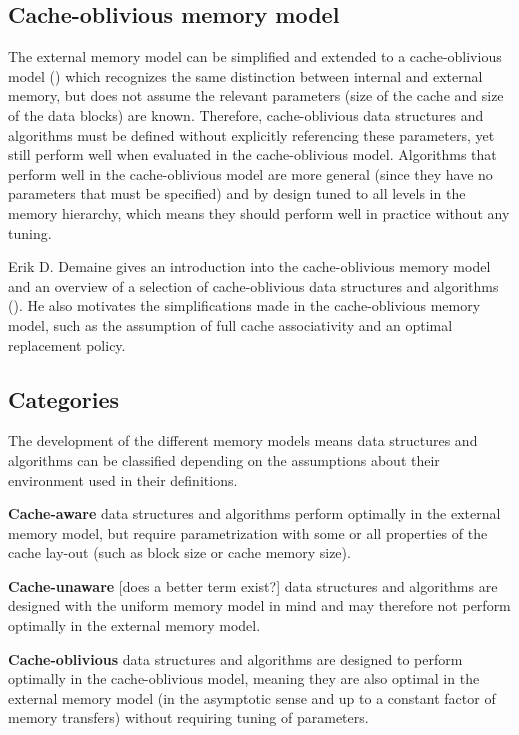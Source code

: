 \documentclass{acm_proc_article-sp}
\begin{document}
\subsection{Cache-oblivious memory model}
The external memory model can be simplified and extended to a cache-oblivious model (\cite{prokop1999coa}) which recognizes the same distinction between internal and external memory, but does not assume the relevant parameters (size of the cache and size of the data blocks) are known. Therefore, cache-oblivious data structures and algorithms must be defined without explicitly referencing these parameters, yet still perform well when evaluated in the cache-oblivious model. Algorithms that perform well in the cache-oblivious model are more general (since they have no parameters that must be specified) and by design tuned to all levels in the memory hierarchy, which means they should perform well in practice without any tuning.

Erik D. Demaine gives an introduction into the cache-oblivious memory model and an overview of a selection of cache-oblivious data structures and algorithms (\cite{demaine2002coa}). He also motivates the simplifications made in the cache-oblivious memory model, such as the assumption of full cache associativity and an optimal replacement policy.

\subsection{Categories}
The development of the different memory models means data structures and algorithms can be classified depending on the assumptions about their environment used in their definitions.
\begin{list}{}{}
\item \textbf{Cache-aware} data structures and algorithms perform optimally in the external memory model, but require parametrization with some or all properties of the cache lay-out (such as block size or cache memory size).
\item \textbf{Cache-unaware} [does a better term exist?] data structures and algorithms  are designed with the uniform memory model in mind and may therefore not perform optimally in the external memory model.
\item \textbf{Cache-oblivious} data structures and algorithms are designed to perform optimally in the cache-oblivious model, meaning they are also optimal in the external memory model (in the asymptotic sense and up to a constant factor of memory transfers) without requiring tuning of parameters.
\end{list}
\end{document}
